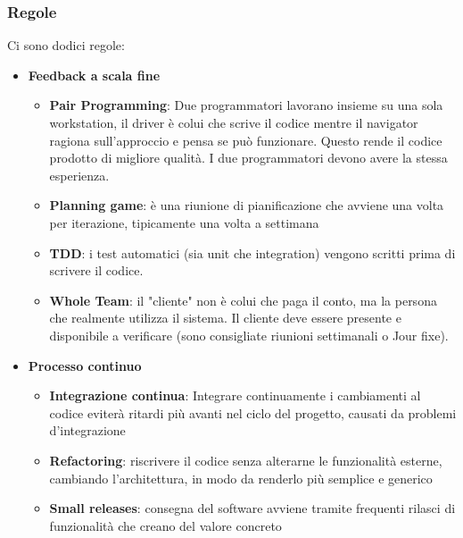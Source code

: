 \documentclass[11pt,a4paper]{book}
\begin{document}
\subsubsection{Regole}
Ci sono dodici regole:
\begin{itemize}
	\item \textbf{Feedback a scala fine}
	\begin{itemize}
		\item \textbf{Pair Programming}: Due programmatori lavorano insieme su una sola workstation, il driver è colui che scrive il codice mentre il navigator ragiona sull'approccio e pensa se può funzionare. Questo rende il codice prodotto di migliore qualità. I due programmatori devono avere la stessa esperienza.
		\item \textbf{Planning game}: è una riunione di pianificazione che avviene una volta per iterazione, tipicamente una volta a settimana
		\item \textbf{TDD}: i test automatici (sia unit che integration) vengono scritti prima di scrivere il codice.
		\item \textbf{Whole Team}: il "cliente" non è colui che paga il conto, ma la persona che realmente utilizza il sistema. Il cliente deve essere presente e disponibile a verificare (sono consigliate riunioni settimanali o Jour fixe).
	\end{itemize}	
	
	\item \textbf{Processo continuo}
	\begin{itemize}
		\item \textbf{Integrazione continua}: Integrare continuamente i cambiamenti al codice eviterà ritardi più avanti nel ciclo del progetto, causati da problemi d'integrazione
		\item \textbf{Refactoring}: riscrivere il codice senza alterarne le funzionalità esterne, cambiando l'architettura, in modo da renderlo più semplice e generico
		\item \textbf{Small releases}: consegna del software avviene tramite frequenti rilasci di funzionalità che creano del valore concreto
	\end{itemize}
	

\end{itemize}
\end{document}
